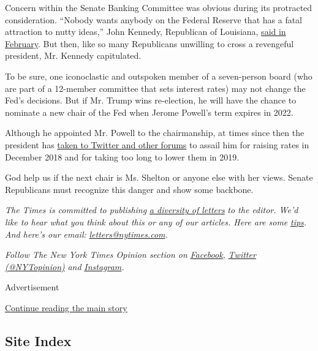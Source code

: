 Concern within the Senate Banking Committee was obvious during its
protracted consideration. ``Nobody wants anybody on the Federal Reserve
that has a fatal attraction to nutty ideas,'' John Kennedy, Republican
of Louisiana,
\href{https://www.wsj.com/articles/republican-senator-raises-concerns-over-sheltons-fed-candidacy-11581608467}{said
in February}. But then, like so many Republicans unwilling to cross a
revengeful president, Mr. Kennedy capitulated.

To be sure, one iconoclastic and outspoken member of a seven-person
board (who are part of a 12-member committee that sets interest rates)
may not change the Fed's decisions. But if Mr. Trump wins re-election,
he will have the chance to nominate a new chair of the Fed when Jerome
Powell's term expires in 2022.

Although he appointed Mr. Powell to the chairmanship, at times since
then the president has
\href{https://www.nytimes.com/2019/06/24/business/economy/federal-reserve-trump.html?action=click\&module=Intentional\&pgtype=Article}{taken
to Twitter and other forums} to assail him for raising rates in December
2018 and for taking too long to lower them in 2019.

God help us if the next chair is Ms. Shelton or anyone else with her
views. Senate Republicans must recognize this danger and show some
backbone.

\emph{The Times is committed to publishing}
\href{https://www.nytimes.com/2019/01/31/opinion/letters/letters-to-editor-new-york-times-women.html}{\emph{a
diversity of letters}} \emph{to the editor. We'd like to hear what you
think about this or any of our articles. Here are some}
\href{https://help.nytimes.com/hc/en-us/articles/115014925288-How-to-submit-a-letter-to-the-editor}{\emph{tips}}\emph{.
And here's our email:}
\href{mailto:letters@nytimes.com}{\emph{letters@nytimes.com}}\emph{.}

\emph{Follow The New York Times Opinion section on}
\href{https://www.facebook.com/nytopinion}{\emph{Facebook}}\emph{,}
\href{http://twitter.com/NYTOpinion}{\emph{Twitter (@NYTopinion)}}
\emph{and}
\href{https://www.instagram.com/nytopinion/}{\emph{Instagram}}\emph{.}

Advertisement

\protect\hyperlink{after-bottom}{Continue reading the main story}

\hypertarget{site-index}{%
\subsection{Site Index}\label{site-index}}

